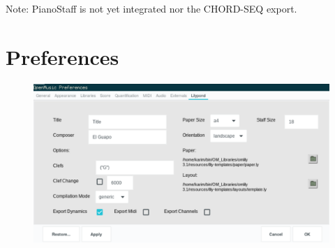 \documentclass{article}
\begin{document}
Note: PianoStaff is not yet integrated nor the CHORD-SEQ export.

\section{Preferences}

\begin{figure}[H]
    \centering
    \includegraphics[scale=0.7]{fig/panel}
  \end{figure}
  
\end{document}
